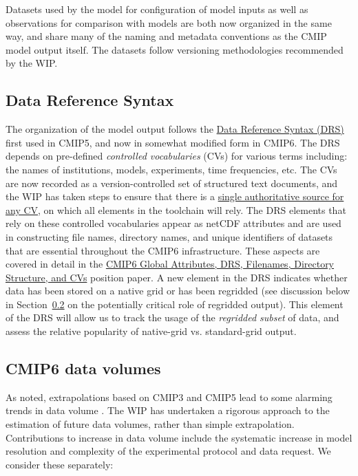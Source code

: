 \documentclass[gmd,manuscript]{copernicus}
\newcommand{\secref}[1] {\mbox{Section  \ref{sec:#1}}}
\begin{document}
Datasets used by the model for configuration of model inputs
\citep[\texttt{input4MIPs}, see][]{ref:duracketal2017} as well as
observations for comparison with models \citep[\texttt{obs4MIPs},
see][]{ref:teixeiraetal2014} are both now organized in the same way, 
and share many of the naming and metadata conventions as the
CMIP model output itself. The datasets follow versioning
methodologies recommended by the WIP.

\subsection{Data Reference Syntax}
\label{sec:data-drs}

The organization of the model output follows the
\href{http://goo.gl/v1drZl}{Data Reference Syntax (DRS)} first used in
CMIP5, and now in somewhat modified form in CMIP6. The DRS depends on
pre-defined \emph{controlled vocabularies} (CVs) for various terms
including: the names of institutions, models, experiments, time
frequencies, etc. The CVs are now recorded as a version-controlled set
of structured text documents, and the WIP has taken steps to ensure
that there is a \href{https://goo.gl/HGafnJ}{single authoritative
  source for any CV}, on which all elements in the toolchain will
rely. The DRS elements that rely on these controlled vocabularies
appear as netCDF attributes and are used in constructing file names,
directory names, and unique identifiers of datasets that are essential
throughout the CMIP6 infrastructure. These aspects are covered in
detail in the \href{https://goo.gl/mSe4rf}{CMIP6 Global Attributes,
  DRS, Filenames, Directory Structure, and CVs} position paper. A new
element in the DRS indicates whether data has been stored on a native
grid or has been regridded (see discussion below in \secref{dvol} on
the potentially critical role of regridded output). This element of
the DRS will allow us to track the usage of the \emph{regridded
  subset} of data, and assess the relative popularity of native-grid
vs. standard-grid output.

\subsection{CMIP6 data volumes}
\label{sec:dvol}

As noted, extrapolations based on CMIP3 and CMIP5 lead to some
alarming trends in data volume \citep[see
e.g.,][]{ref:overpecketal2011}. The WIP has undertaken a rigorous
approach to the estimation of future data volumes, rather than simple
extrapolation. Contributions to increase in data volume include the
systematic increase in model resolution and complexity of the
experimental protocol and data request. We consider these separately:
\end{document}
